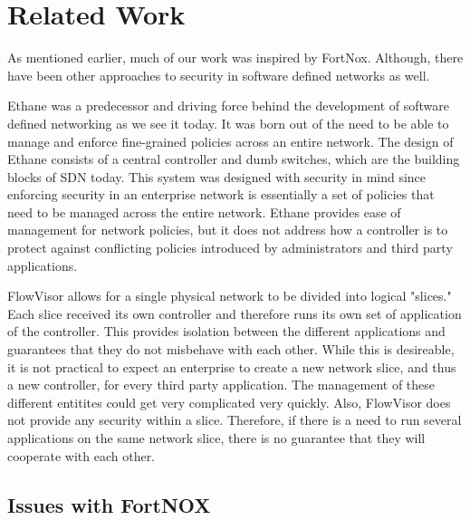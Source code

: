 \section{Related Work}
\label{sec:related}

As mentioned earlier, much of our work was inspired by FortNox. Although, there have been other approaches to security in software defined networks as well.

Ethane \cite{Casado:2007:ETC:1282380.1282382} was a predecessor and driving force behind the development of software defined networking as we see it today.
It was born out of the need to be able to manage and enforce fine-grained policies across an entire network.
The design of Ethane consists of a central controller and dumb switches, which are the building blocks of SDN today.
This system was designed with security in mind since enforcing security in an enterprise network is essentially a set of policies that need to be managed across the entire network.
Ethane provides ease of management for network policies, but it does not address how a controller is to protect against conflicting policies introduced by administrators and third party applications.

FlowVisor \cite{flowvisor} allows for a single physical network to be divided into logical "slices."
Each slice received its own controller and therefore runs its own set of application of the controller.
This provides isolation between the different applications and guarantees that they do not misbehave with each other.
While this is desireable, it is not practical to expect an enterprise to create a new network slice, and thus a new controller, for every third party application.
The management of these different entitites could get very complicated very quickly.
Also, FlowVisor does not provide any security within a slice.
Therefore, if there is a need to run several applications on the same network slice, there is no guarantee that they will cooperate with each other.


\subsection{Issues with FortNOX}
\label{sec:fortnox}
